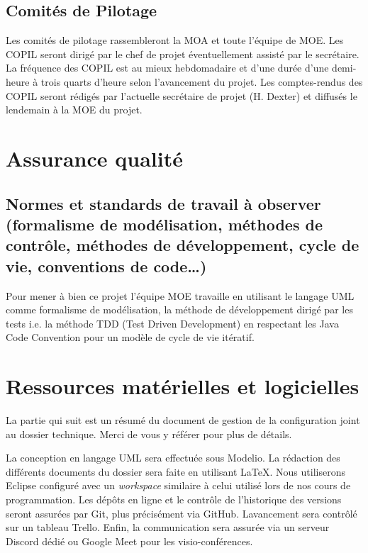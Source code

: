 \subsection{Comités de Pilotage}
Les comités de pilotage rassembleront la MOA et toute l’équipe de MOE. Les
COPIL seront dirigé par le chef de projet éventuellement assisté par le
secrétaire.
\\La fréquence des COPIL est au mieux hebdomadaire et d’une durée d’une
demi-heure à trois quarts d’heure selon l’avancement du projet.
Les comptes-rendus des COPIL seront rédigés par l’actuelle secrétaire de
projet (H. Dexter) et diffusés le lendemain à la MOE du projet.


\section{Assurance qualité}
\subsection{Normes et standards de travail à observer (formalisme de modélisation, méthodes de contrôle, méthodes de développement, cycle de vie, conventions de code…)}
Pour mener à bien ce projet l'équipe MOE travaille
en utilisant le langage UML comme formalisme de modélisation, la méthode de
développement dirigé par les tests i.e. la méthode TDD (Test Driven
Development) en respectant les Java Code Convention pour un modèle de cycle
de vie itératif.



\section{Ressources matérielles et logicielles}
La partie qui suit est un résumé du document de gestion de la configuration joint
au dossier technique. Merci de vous y référer pour plus de détails.

        La conception en langage UML sera effectuée sous Modelio. La rédaction des
différents documents du dossier sera faite en utilisant \LaTeX. Nous utiliserons
Eclipse configuré avec un \emph{workspace} similaire à celui utilisé lors de nos
cours de programmation. Les dépôts en ligne et le contrôle de l'historique des
versions seront assurées par Git, plus précisément via GitHub. Lavancement sera
contrôlé sur un tableau Trello. Enfin, la communication sera assurée via un
serveur Discord dédié ou Google Meet pour les visio-conférences.